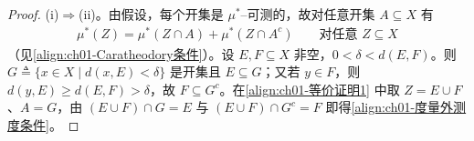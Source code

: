 \documentclass[../../main.tex]{subfiles}%
\begin{document}
\begin{proof}
(i)$\Rightarrow$(ii)。由假设，每个开集是 $\mu^*$--可测的，故对任意开集 $A\subseteq X$ 有
\begin{align}
\mu^*(Z)=\mu^*(Z\cap A)+\mu^*(Z\cap A^c)\qquad\text{对任意 }Z\subseteq X \label{align:ch01-等价证明1}
\end{align}
（见\eqref{align:ch01-Caratheodory条件}）。设 $E,F\subseteq X$ 非空，$0<\delta<d(E,F)$。则 $G\triangleq\{x\in X\mid d(x,E)<\delta\}$ 是开集且 $E\subseteq G$；又若 $y\in F$，则 $d(y,E)\geqslant d(E,F)>\delta$，故 $F\subseteq G^c$。在\eqref{align:ch01-等价证明1} 中取 $Z=E\cup F$、$A=G$，由 $(E\cup F)\cap G=E$ 与 $(E\cup F)\cap G^c=F$ 即得\eqref{align:ch01-度量外测度条件}。


\end{proof}
\end{document}
